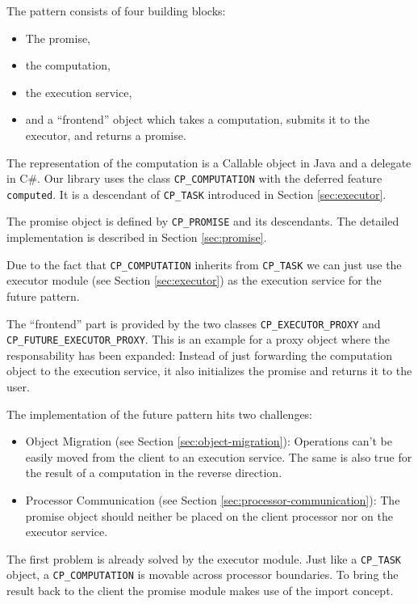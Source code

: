 The pattern consists of four building blocks:
\begin{itemize}
 \item The promise,
 \item the computation,
 \item the execution service,
 \item and a ``frontend'' object which takes a computation, submits it to the executor, and returns a promise.
\end{itemize}

The representation of the computation is a Callable object in Java and a delegate in C\#.
Our library uses the class \lstinline!CP_COMPUTATION! with the deferred feature \lstinline!computed!.
It is a descendant of \lstinline!CP_TASK! introduced in Section \ref{sec:executor}.

The promise object is defined by \lstinline!CP_PROMISE! and its descendants.
The detailed implementation is described in Section \ref{sec:promise}.

Due to the fact that \lstinline!CP_COMPUTATION! inherits from \lstinline!CP_TASK! we can just use the executor module (see Section \ref{sec:executor}) as the execution service for the future pattern.

The ``frontend'' part is provided by the two classes \lstinline!CP_EXECUTOR_PROXY! and \lstinline!CP_FUTURE_EXECUTOR_PROXY!.
This is an example for a proxy object where the responsability has been expanded:
Instead of just forwarding the computation object to the execution service, it also initializes the promise and returns it to the user.

The implementation of the future pattern hits two challenges:
\begin{itemize}
 \item Object Migration (see Section \ref{sec:object-migration}): Operations can't be easily moved from the client to an execution service.
 The same is also true for the result of a computation in the reverse direction.
 \item Processor Communication (see Section \ref{sec:processor-communication}): The promise object should neither be placed on the client processor nor on the executor service.
\end{itemize}

The first problem is already solved by the executor module. 
Just like a \lstinline!CP_TASK! object, a \lstinline!CP_COMPUTATION! is movable across processor boundaries.
To bring the result back to the client the promise module makes use of the import concept.

